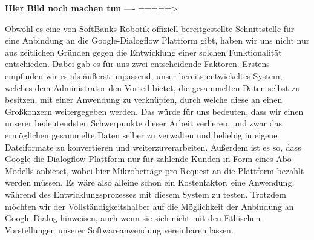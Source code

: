 \textbf {Hier Bild  noch machen tun} ---- =====>

Obwohl es eine von SoftBanks-Robotik offiziell bereitgestellte Schnittstelle für eine Anbindung an die Google-Dialogflow Plattform gibt, haben wir uns nicht nur aus zeitlichen Gründen gegen die Entwicklung einer solchen Funktionalität entschieden. Dabei gab es für uns zwei entscheidende Faktoren. Erstens empfinden wir es als äußerst unpassend, unser bereits entwickeltes System, welches dem Administrator den Vorteil bietet, die gesammelten Daten selbst zu besitzen, mit einer Anwendung zu verknüpfen, durch welche diese an einen Großkonzern weitergegeben werden. Das würde für uns bedeuten, dass wir einen unserer bedeutendsten Schwerpunkte dieser Arbeit verlieren, und zwar das ermöglichen gesammelte Daten selber zu verwalten und beliebig in eigene Dateiformate zu konvertieren und weiterzuverarbeiten. Außerdem ist es so, dass Google die Dialogflow Plattform nur für zahlende Kunden in Form eines Abo-Modells anbietet, wobei hier Mikrobeträge pro Request an die Plattform bezahlt werden müssen. Es wäre also alleine schon ein Kostenfaktor, eine Anwendung, während des Entwicklungsprozesses mit diesem System zu testen. Trotzdem möchten wir der Vollständigkeitshalber auf die Möglichkeit der Anbindung an Google Dialog hinweisen, auch wenn sie sich nicht mit den Ethischen-Vorstellungen unserer Softwareanwendung vereinbaren lassen.
